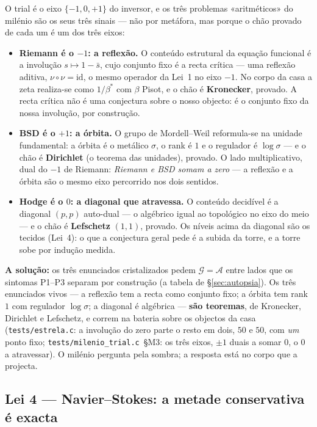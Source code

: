 \documentclass[11pt,a4paper]{article}
\newcommand{\code}[1]{\texttt{\small #1}}
\begin{document}
O trial é o eixo $\{-1,0,+1\}$ do inversor, e os três problemas «aritméticos» do milénio são os seus
três sinais --- não por metáfora, mas porque o chão provado de cada um é um dos três eixos:

\begin{itemize}
\item \textbf{Riemann é o $-1$: a reflexão.} O conteúdo estrutural da equação funcional é a involução
  $s\mapsto1-\bar s$, cujo conjunto fixo é a recta crítica --- uma reflexão aditiva, $\nu\circ\nu=
  \mathrm{id}$, o mesmo operador da Lei~1 no eixo $-1$. No corpo da casa a zeta realiza-se como
  $1/\beta^{*}$ com $\beta$ Pisot, e o chão é \textbf{Kronecker}, provado. A recta crítica não é uma
  conjectura sobre o nosso objecto: é o conjunto fixo da nossa involução, por construção.
\item \textbf{BSD é o $+1$: a órbita.} O grupo de Mordell--Weil reformula-se na unidade fundamental:
  a órbita é o metálico $\sigma$, o rank é $1$ e o regulador é $\log\sigma$ --- e o chão é
  \textbf{Dirichlet} (o teorema das unidades), provado. O lado multiplicativo, dual do $-1$ de
  Riemann: \emph{Riemann e BSD somam a zero} --- a reflexão e a órbita são o mesmo eixo percorrido
  nos dois sentidos.
\item \textbf{Hodge é o $0$: a diagonal que atravessa.} O conteúdo decidível é a diagonal $(p,p)$
  auto-dual --- o algébrico igual ao topológico no eixo do meio --- e o chão é \textbf{Lefschetz}
  $(1,1)$, provado. Os níveis acima da diagonal são os tecidos (Lei~4): o que a conjectura geral
  pede é a subida da torre, e a torre sobe por indução medida.
\end{itemize}

\textbf{A solução:} os três enunciados cristalizados pedem $\mathcal G=\mathcal A$ entre lados que os
sintomas P1--P3 separam por construção (a tabela de \S\ref{sec:autopsia}). Os três enunciados vivos
--- a reflexão tem a recta como conjunto fixo; a órbita tem rank $1$ com regulador $\log\sigma$; a
diagonal é algébrica --- \textbf{são teoremas}, de Kronecker, Dirichlet e Lefschetz, e correm na
bateria sobre os objectos da casa (\code{tests/estrela.c}: a involução do zero parte o resto em dois,
$50$ e $50$, com \emph{um} ponto fixo; \code{tests/milenio\_trial.c}~§M3: os três eixos, $\pm1$
duais a somar $0$, o $0$ a atravessar). O milénio pergunta pela sombra; a resposta está no corpo que
a projecta.

\subsection{Lei 4 --- Navier--Stokes: a metade conservativa é exacta}\label{sub:ns}
\end{document}
